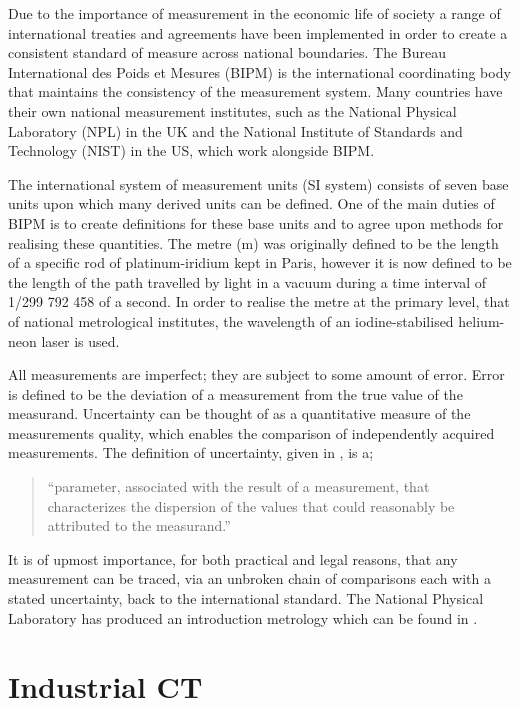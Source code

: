 \documentclass[
  twoside,
  11pt, a4paper,
  footinclude=true,
  headinclude=true,
  cleardoublepage=empty
]{scrbook}
\begin{document}
Due to the importance of measurement in the economic life of society a range of international treaties and agreements have been implemented in order to create a consistent standard of measure across national boundaries. The Bureau International des Poids et Mesures (BIPM) is the international coordinating body that maintains the consistency of the measurement system. Many countries have their own national measurement institutes, such as the National Physical Laboratory (NPL) in the UK and the National Institute of Standards and Technology (NIST) in the US, which work alongside BIPM.

The international system of measurement units (SI system) consists of seven base units upon which many derived units can be defined. One of the main duties of BIPM is to create definitions for these base units and to agree upon methods for realising these quantities. The metre (m) was originally defined to be the length of a specific rod of platinum-iridium kept in Paris, however it is now defined to be the length of the path travelled by light in a vacuum during a time interval of 1/299 792 458 of a second. In order to realise the metre at the primary level, that of national metrological institutes, the wavelength of an iodine-stabilised helium-neon laser is used.

All measurements are imperfect; they are subject to some amount of error. Error is defined to be the deviation of a measurement from the true value of the measurand. Uncertainty can be thought of as a quantitative measure of the measurements quality, which enables the comparison of independently acquired measurements. The definition of uncertainty, given in \cite{JointCommitteeforGuidesinMetrologyJCGM2008}, is a;
\begin{quote}
``parameter, associated with the result of a measurement, that characterizes the dispersion of the values that could reasonably be attributed to the measurand.''
\end{quote}

It is of upmost importance, for both practical and legal reasons, that any measurement can be traced, via an unbroken chain of comparisons each with a stated uncertainty, back to the international standard. The National Physical Laboratory has produced an introduction metrology which can be found in \cite{Flack2005}.

\section{Industrial CT}
\end{document}
